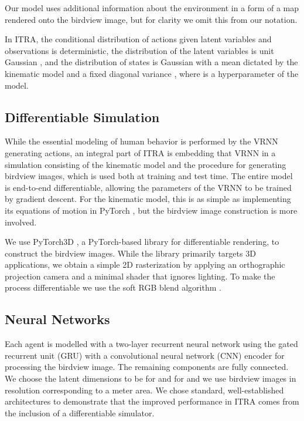 \documentclass[letterpaper, 10 pt, conference]{ieeeconf}
\begin{document}
Our model uses additional information about the environment in a form of a map rendered onto the birdview image, but for clarity we omit this from our notation.

In ITRA, the conditional distribution of actions given latent variables and observations  is deterministic, the distribution of the latent variables is unit Gaussian , and the distribution of states is Gaussian with a mean dictated by the kinematic model and a fixed diagonal variance , where  is a hyperparameter of the model.

\subsection{Differentiable Simulation}

While the essential modeling of human behavior is performed by the VRNN generating actions, an integral part of ITRA is embedding that VRNN in a simulation consisting of the kinematic model and the procedure for generating birdview images, which is used both at training and test time. The entire model is end-to-end differentiable, allowing the parameters of the VRNN to be trained by gradient descent. For the kinematic model, this is as simple as implementing its equations of motion in PyTorch \cite{paszke_pytorch_2019}, but the birdview image construction is more involved.

We use PyTorch3D \cite{ravi_accelerating_2020}, a PyTorch-based library for differentiable rendering, to construct the birdview images. While the library primarily targets 3D applications, we obtain a simple 2D rasterization by applying an orthographic projection camera and a minimal shader that ignores lighting. To make the process differentiable we use the soft RGB blend algorithm \cite{liu_soft_2019}.


\subsection{Neural Networks}

Each agent is modelled with a two-layer recurrent neural network using the gated recurrent unit (GRU) with a convolutional neural network (CNN) encoder for processing the birdview image. The remaining components are fully connected. We choose the latent dimensions to be  for  and  for  and we use birdview images in  resolution corresponding to a  meter area. We chose standard, well-established architectures to demonstrate that the improved performance in ITRA comes from the inclusion of a differentiable simulator.
\end{document}
